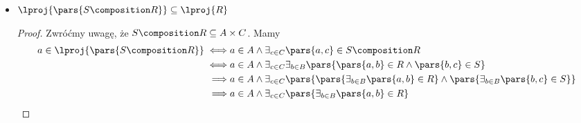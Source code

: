 \begin{description}
\begin{itemize}
\begin{proof}
\begin{equation*}
\begin{split}
                        \end{split}
                    \end{equation*}
                    Pierwsze przejście jest tylko implikacją. Oczywiście jeśli \(\pars{a, b} \in R\), to możemy powiedzieć, że zarówno \(a\), jak i~\(b\) mają parę w~\(R\). Jednak z~samego faktu, że \(a\)~i~\(b\) mają parę w~\(R\), nie wynika jeszcze, że \(a\)~i~\(b\)~\emph{są} parą w~\(R\). Dlatego w~ogólnym przypadku mamy tu zaledwie inkluzję, a~nie równość, co łatwo zobaczyć na przykładzie:
                    \begin{align*}
                        A &= \set{a_0, a_1}\\
                        B &= \set{b_0, b_0}\\
                        R &= \set{\pars{a_0, b_0}, \pars{a_1, b_1}}\\
                        \lproj{R} &= \pars{a_0, a_1}\\
                        \rproj{R} &= \pars{b_0, b_1}\\
                        \lproj{R} \times \rproj{R} &= \set{\pars{a_0, b_0}, \pars{a_0, b_1}, \pars{a_1, b_0}, \pars{a_1, b_1}}\\
                        R &\subsetneq \lproj{R} \times \rproj{R}
                    \end{align*}
                \end{proof}
            \item \(\lproj{\pars{S \composition R}} \subseteq \lproj{R}\)
                \begin{proof}
                    Zwróćmy uwagę, że \(S \composition R \subseteq A \times C\). Mamy
                    \begin{equation*}
                        \begin{split}
                            a \in \lproj{\pars{S \composition R}}
                                \iff& a \in A \land \exists_{c \in C} \pars{a, c} \in S \composition R\\
                                \iff& a \in A \land \exists_{c \in C}\exists_{b \in B} \pars{\pars{a, b} \in R \land \pars{b, c} \in S}\\
                                \implies& a \in A \land \exists_{c \in C}\pars{\pars{\exists_{b \in B} \pars{a, b} \in R} \land \pars{\exists_{b \in B} \pars{b, c} \in S}}\\
                                \implies& a \in A \land \exists_{c \in C}\pars{\exists_{b \in B} \pars{a, b} \in R}\\

\end{split}
\end{equation*}
\end{proof}
\end{itemize}
\end{description}

